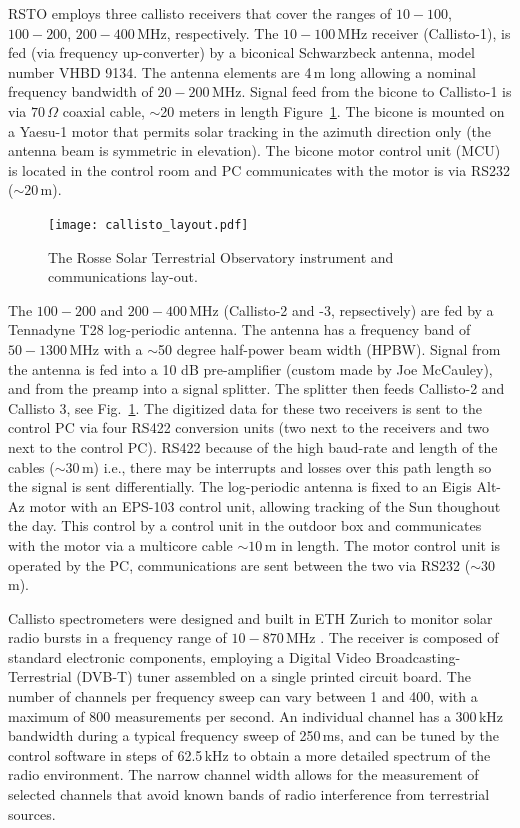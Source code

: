 RSTO employs three callisto receivers that cover the ranges of $10-100$, $100-200$, $200-400$\,MHz, respectively. The $10-100$\,MHz receiver (Callisto-1), is fed (via frequency up-converter) by a biconical Schwarzbeck antenna, model number VHBD 9134. The antenna elements are 4\,m long allowing a nominal frequency bandwidth of $20-200$\,MHz. Signal feed from the bicone to Callisto-1 is via $70\,\Omega$ coaxial cable, $\sim$20 meters in length Figure~\ref{fig:rsto_layout}. The bicone is mounted on a Yaesu-1 motor that permits solar tracking in the azimuth direction only (the antenna beam is symmetric in elevation). The bicone motor control unit (MCU) is located in the control room and PC communicates with the motor is via RS232 ($\sim20$\,m).
\begin{figure}[!t]
\begin{center}
\texttt{[image: callisto\_layout.pdf]}
\caption[RSTO Instrumental Setup]{The Rosse Solar Terrestrial Observatory instrument and communications lay-out.}
\label{fig:rsto_layout}
\end{center}
\end{figure}

The $100-200$ and $200-400$\,MHz (Callisto-2 and -3, repsectively) are fed by a Tennadyne T28 log-periodic antenna. The antenna has a frequency band of $50 -1300$\,MHz with a $\sim$50 degree half-power beam width (HPBW). Signal from the antenna is fed into a 10 dB pre-amplifier (custom made by Joe McCauley), and from the preamp into a signal splitter. The splitter then feeds Callisto-2 and Callisto 3, see Fig.~\ref{fig:rsto_layout}. The digitized data for these two receivers is sent to the control PC via four RS422 conversion units (two next to the receivers and two next to the control PC). RS422 because of the high baud-rate and length of the cables ($\sim30$\,m) i.e., there may be interrupts and losses over this path length so the signal is sent differentially. The log-periodic antenna is fixed to an Eigis Alt-Az motor with an EPS-103 control unit, allowing tracking of the Sun thoughout the day. This control by a control unit in the outdoor box and communicates with the motor via a multicore cable $\sim10$\,m in length. The motor control unit is operated by the PC, communications are sent between the two via RS232 ($\sim30$\,m).

Callisto spectrometers were designed and built in ETH Zurich to monitor solar radio bursts in a frequency range of $10 - 870$\,MHz \citep{Benz2005}. The receiver is composed of standard electronic components, employing a Digital Video Broadcasting-Terrestrial (DVB-T) tuner assembled on a single printed circuit board. The number of channels per frequency sweep can vary between 1 and 400, with a maximum of 800 measurements per second. An individual channel has a 300\,kHz bandwidth during a typical frequency sweep of 250\,ms, and can be tuned by the control software in steps of 62.5\,kHz to obtain a more detailed spectrum of the radio environment. The narrow channel width allows for the measurement of selected channels that avoid known bands of radio interference from terrestrial sources.

